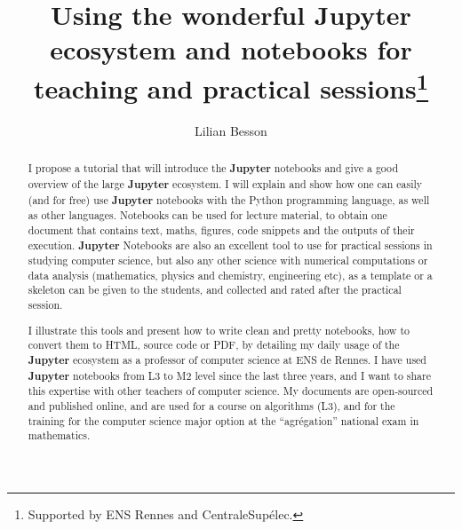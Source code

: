 \documentclass[runningheads]{llncs}
\newcommand{\Jupyter}{\textbf{Jupyter}}
\begin{document}
%
\title{Using the wonderful \Jupyter{} ecosystem and notebooks for teaching and practical sessions\thanks{Supported by ENS Rennes and CentraleSup{\'e}lec.}}
%
\titlerunning{Introduction to \Jupyter{} notebooks}
%
\author{Lilian Besson}
%
%
%
\maketitle              %
%
\begin{abstract}

    I propose a tutorial that will introduce the \Jupyter{} notebooks and give a good overview of the large \Jupyter{} ecosystem.
    I will explain and show how one can easily (and for free) use \Jupyter{} notebooks with the Python programming language, as well as other languages.
    Notebooks can be used for lecture material, to obtain one document that contains text, maths, figures, code snippets and the outputs of their execution.
    \Jupyter{} Notebooks are also an excellent tool to use for practical sessions in studying computer science, but also any other science with numerical computations or data analysis (mathematics, physics and chemistry, engineering etc), as a template or a skeleton can be given to the students, and collected and rated after the practical session.

    I illustrate this tools and present how to write clean and pretty notebooks, how to convert them to HTML, source code or PDF, by detailing my daily usage of the \Jupyter{} ecosystem as a professor of computer science at ENS de Rennes.
    I have used \Jupyter{} notebooks from L3 to M2 level since the last three years, and I want to share this expertise with other teachers of computer science.
    My documents are open-sourced and published online, and are used for a course on algorithms (L3), and for the training for the computer science major option at the ``agr{\'e}gation'' national exam in mathematics.


\end{abstract}
%
%
%
\end{document}
